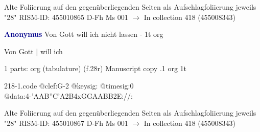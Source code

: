 \documentclass[twocolumn]{book}
\begin{document}
\newline Alte Foliierung auf den gegenüberliegenden Seiten als Aufschlagfoliierung jeweils "28"
\newline RISM-ID: 455010865
\newline D-Fh  Ms 001
\newline $\rightarrow$ In collection 418 (455008343)
      
\newline \par \vspace{7pt} \textcolor{darkblue}{\textbf{Anonymus  }}
\newline Von Gott will ich nicht lassen - 1t
\newline org
\newline \begin{itshape}[f.28r, at left:] Von Gott | will ich\end{itshape} 
\newline \textcolor{darkblue}{}  1 parts: org (tabulature)  (f.28r)
\newline Manuscript copy
.1  org  1t  
\begin{filecontents*}{218-1.code}
@clef:G-2
@keysig:
@timesig:0
@data:4-'AAB''C'A2B4xGGAABB2E://:
\end{filecontents*}
\newline
%

\newline Alte Foliierung auf den gegenüberliegenden Seiten als Aufschlagfoliierung jeweils "28"
\newline RISM-ID: 455010867
\newline D-Fh  Ms 001
\newline $\rightarrow$ In collection 418 (455008343)
      
\end{document}
